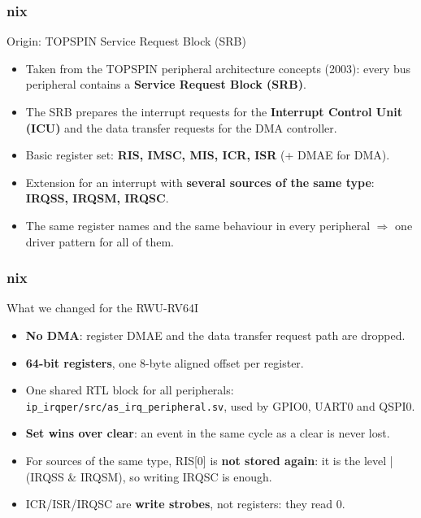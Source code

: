 \documentclass{beamer}
\newcommand{\astitle}{nix}
\newcommand{\assubtitle}{nix}
\newcommand{\cmd}[1]{\texttt{#1}}
\begin{document}
\renewcommand{\assubtitle}{Origin: TOPSPIN Service Request Block (SRB)}
\begin{frame}
\frametitle{\astitle}
\begin{block}{\assubtitle}
  \begin{itemize}
    \item Taken from the TOPSPIN peripheral architecture concepts (2003):
      every bus peripheral contains a \textbf{Service Request Block (SRB)}.
    \item The SRB prepares the interrupt requests for the
      \textbf{Interrupt Control Unit (ICU)} and the data transfer requests
      for the DMA controller.
    \item Basic register set: \textbf{RIS, IMSC, MIS, ICR, ISR}
      (+ DMAE for DMA).
    \item Extension for an interrupt with \textbf{several sources of the same type}:
      \textbf{IRQSS, IRQSM, IRQSC}.
    \item The same register names and the same behaviour in every peripheral
      $\Rightarrow$ one driver pattern for all of them.
  \end{itemize}
\end{block}
\end{frame}

\renewcommand{\assubtitle}{What we changed for the RWU-RV64I}
\begin{frame}
\frametitle{\astitle}
\begin{block}{\assubtitle}
  \begin{itemize}
    \item \textbf{No DMA}: register DMAE and the data transfer request path are dropped.
    \item \textbf{64-bit registers}, one 8-byte aligned offset per register.
    \item One shared RTL block for all peripherals:\\
      \cmd{ip\_irqper/src/as\_irq\_peripheral.sv}, used by GPIO0, UART0 and QSPI0.
    \item \textbf{Set wins over clear}: an event in the same cycle as a clear
      is never lost.
    \item For sources of the same type, RIS[0] is \textbf{not stored again}:
      it is the level |(IRQSS \& IRQSM), so writing IRQSC is enough.
    \item ICR/ISR/IRQSC are \textbf{write strobes}, not registers: they read 0.
  \end{itemize}
\end{block}
\end{frame}
\end{document}
